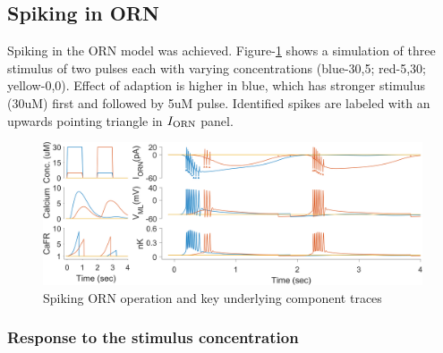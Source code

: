 \documentclass[
]{article}
\begin{document}
\hypertarget{spiking-in-orn}{%
\subsection{Spiking in ORN}\label{spiking-in-orn}}

Spiking in the ORN model was achieved. Figure-\ref{fig:rORN} shows a simulation of three stimulus of two pulses each with varying concentrations (blue-30,5; red-5,30; yellow-0,0). Effect of adaption is higher in blue, which has stronger stimulus (30uM) first and followed by 5uM pulse. Identified spikes are labeled with an upwards pointing triangle in \(I_{\rm ORN}\) panel.

\begin{figure}

{\centering \includegraphics[width=0.9\linewidth]{figs/v1/fig_spk_all_components} 

}

\caption{Spiking ORN operation and key underlying component traces}\label{fig:rORN}
\end{figure}

\hypertarget{response-to-the-stimulus-concentration}{%
\subsubsection{Response to the stimulus concentration}\label{response-to-the-stimulus-concentration}}
\end{document}
